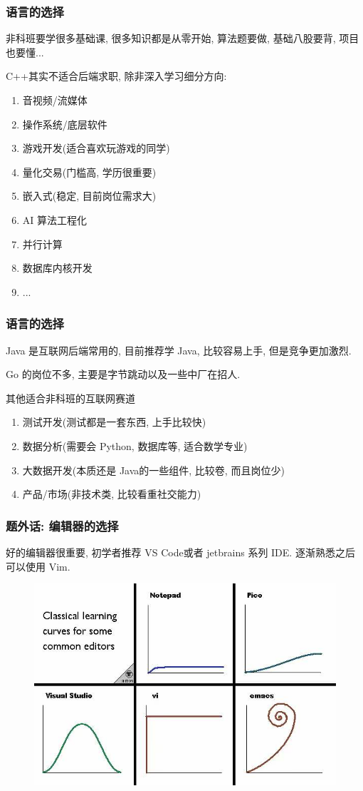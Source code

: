 \documentclass{ctexbeamer}
\begin{document}
\begin{frame}
	\frametitle{语言的选择}

	非科班要学很多基础课, 很多知识都是从零开始, 算法题要做, 基础八股要背, 项目也要懂...

	C++其实不适合后端求职, 除非深入学习细分方向:
	\begin{enumerate}
		\item 音视频/流媒体
		\item 操作系统/底层软件
		\item 游戏开发(适合喜欢玩游戏的同学)
		\item 量化交易(门槛高, 学历很重要)
		\item 嵌入式(稳定, 目前岗位需求大)
		\item AI 算法工程化
		\item 并行计算
		\item 数据库内核开发
		\item ...
	\end{enumerate}
\end{frame}
\begin{frame}
	\frametitle{语言的选择}
	Java 是互联网后端常用的, 目前推荐学 Java, 比较容易上手, 但是竞争更加激烈.

	Go 的岗位不多, 主要是字节跳动以及一些中厂在招人.

	\begin{exampleblock}{其他适合非科班的互联网赛道}
		\begin{enumerate}
			\item 测试开发(测试都是一套东西, 上手比较快)
			\item 数据分析(需要会 Python, 数据库等, 适合数学专业)
			\item 大数据开发(本质还是 Java的一些组件, 比较卷, 而且岗位少)
			\item 产品/市场(非技术类, 比较看重社交能力)
		\end{enumerate}
	\end{exampleblock}
\end{frame}

\begin{frame}
	\frametitle{题外话:  编辑器的选择}
	好的编辑器很重要, 初学者推荐 VS Code或者 jetbrains 系列 IDE. 
	逐渐熟悉之后可以使用 Vim. 
	\begin{figure}\centering
		\includegraphics[width=.7\textwidth]{figures/editor.jpg}
	\end{figure}
\end{frame}
\end{document}
